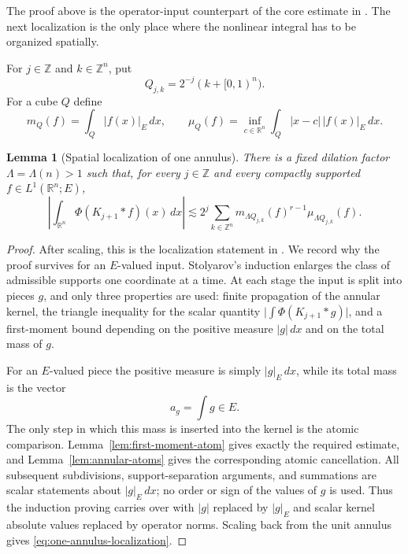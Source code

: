 \documentclass[11pt]{amsart}
\numberwithin{equation}{section}
\newtheorem{lemma}[theorem]{Lemma}
\theoremstyle{definition}
\theoremstyle{remark}
\newcommand{\R}{\mathbb R}
\begin{document}
The proof above is the operator-input counterpart of the core estimate in
\cite[Lemma~3.1 and Corollary~3.2]{Stolyarov24}.  The next localization is the
only place where the nonlinear integral has to be organized spatially.

For $j\in\mathbb Z$ and $k\in\mathbb Z^n$, put
\[
 Q_{j,k}=2^{-j}(k+[0,1)^n).
\]
For a cube $Q$ define
\begin{equation}\label{eq:mass-moment}
 m_Q(f)=\int_Q|f(x)|_E\,dx,
 \qquad
 \mu_Q(f)=\inf_{c\in\R^n}\int_Q|x-c|\,|f(x)|_E\,dx.
\end{equation}

\begin{lemma}[Spatial localization of one annulus]\label{lem:one-annulus-localization}
There is a fixed dilation factor $\Lambda=\Lambda(n)>1$ such that, for every
$j\in\mathbb Z$ and every compactly supported $f\in L^1(\R^n;E)$,
\begin{equation}\label{eq:one-annulus-localization}
 \left|\int_{\R^n}\Phi(K_{j+1}*f)(x)\,dx\right|
 \lesssim
 2^j\sum_{k\in\mathbb Z^n}
 m_{\Lambda Q_{j,k}}(f)^{r-1}\mu_{\Lambda Q_{j,k}}(f).
\end{equation}
\end{lemma}

\begin{proof}
After scaling, this is the localization statement in
\cite[Theorem~3.1 and its proof]{Stolyarov24}.  We record why the proof survives
for an $E$-valued input.  Stolyarov's induction enlarges the class of admissible
supports one coordinate at a time.  At each stage the input is split into
pieces $g$, and only three properties are used: finite propagation of the
annular kernel, the triangle inequality for the scalar quantity
$\bigl|\int\Phi(K_{j+1}*g)\bigr|$, and a first-moment bound depending on the
positive measure $|g|\,dx$ and on the total mass of $g$.

For an $E$-valued piece the positive measure is simply $|g|_E\,dx$, while its
total mass is the vector
\[
 a_g=\int g\in E.
\]
The only step in which this mass is inserted into the kernel is the atomic
comparison.  Lemma~\ref{lem:first-moment-atom} gives exactly the required
estimate, and Lemma~\ref{lem:annular-atoms} gives the corresponding atomic
cancellation.  All subsequent subdivisions, support-separation arguments, and
summations are scalar statements about $|g|_E\,dx$; no order or sign of the
values of $g$ is used.  Thus the induction proving
\cite[Theorem~3.1]{Stolyarov24} carries over with $|g|$ replaced by $|g|_E$
and scalar kernel absolute values replaced by operator norms.  Scaling back
from the unit annulus gives \eqref{eq:one-annulus-localization}.
\end{proof}
\end{document}
